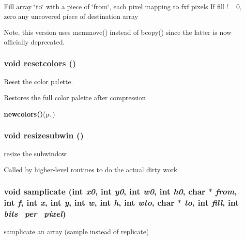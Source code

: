 Fill array \char`\"{}to\char`\"{} with a piece of \char`\"{}from\char`\"{}, each pixel mapping to fxf pixels If fill != 0, zero any uncovered piece of destination array

Note, this version uses memmove() instead of bcopy() since the latter is now officially deprecated. 
\subsubsection{\setlength{\rightskip}{0pt plus 5cm}void resetcolors ()}\label{xtv_8h_a94}


Reset the color palette. 

Restores the full color palette after compression

\begin{Desc}
\item[See also:]{\bf newcolors()}{\rm (p.\,\pageref{xtv_8h_a95})} \end{Desc}
\subsubsection{\setlength{\rightskip}{0pt plus 5cm}void resizesubwin ()}\label{xtv_8h_a88}


resize the subwindow 

Called by higher-level routines to do the actual dirty work 
\subsubsection{\setlength{\rightskip}{0pt plus 5cm}void samplicate (int {\em x0}, int {\em y0}, int {\em w0}, int {\em h0}, char $\ast$ {\em from}, int {\em f}, int {\em x}, int {\em y}, int {\em w}, int {\em h}, int {\em wto}, char $\ast$ {\em to}, int {\em fill}, int {\em bits\_\-per\_\-pixel})}\label{xtv_8h_a121}


samplicate an array (sample instead of replicate) 

